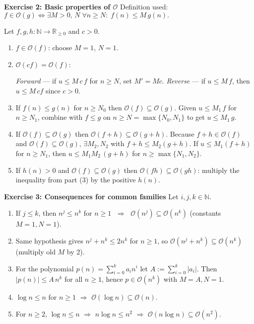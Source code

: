\documentclass{article}
\theoremstyle{theorem}
\theoremstyle{definition}
\theoremstyle{remark}
\begin{document}
\bigskip
\textbf{Exercise 2: Basic properties of \(\mathcal O\)}
Definition used: \(f\in\mathcal O(g)\iff\exists M>0,\,N\;\forall n\ge N:\;f(n)\le M\,g(n).\)

Let $f,g,h:\mathbb N\!\to\!\mathbb R_{\ge0}$ and $c>0$.

\begin{enumerate}
  \item $f\in\mathcal O(f)$: choose $M=1$, $N=1$.

  \item $\mathcal O(cf)=\mathcal O(f)$:  

        \emph{Forward} — if $u\le M\,c\,f$ for $n\ge N$, set $M'=Mc$.  
        \emph{Reverse} — if $u\le M\,f$, then $u\le M\,cf$ since $c>0$.

  \item If $f(n)\le g(n)$ for $n\ge N_0$ then $\mathcal O(f)\subseteq\mathcal O(g)$.  
        Given $u\le M_1\,f$ for $n\ge N_1$, combine with $f\le g$ on  
        $n\ge N=\max\{N_0,N_1\}$ to get $u\le M_1\,g$.

  \item If $\mathcal O(f)\subseteq\mathcal O(g)$ then  
        $\mathcal O(f+h)\subseteq\mathcal O(g+h)$.  
        Because $f+h\in\mathcal O(f)$ and $\mathcal O(f)\subseteq\mathcal O(g)$,  
        $\exists M_2,N_2$ with $f+h\le M_2(g+h)$.  
        If $u\le M_1(f+h)$ for $n\ge N_1$, then  
        $u\le M_1M_2\,(g+h)$ for $n\ge\max\{N_1,N_2\}$.

  \item If $h(n)>0$ and $\mathcal O(f)\subseteq\mathcal O(g)$ then  
        $\mathcal O(fh)\subseteq\mathcal O(gh)$:  
        multiply the inequality from part (3) by the positive $h(n)$.
\end{enumerate}


\bigskip
\textbf{Exercise 3: Consequences for common families}
Let $i,j,k\in\mathbb N$.

\begin{enumerate}
  \item If $j\le k$, then $n^{j}\le n^{k}$ for $n\ge1$  
        $\;\Rightarrow\;$ $\mathcal O(n^{j})\subseteq\mathcal O(n^{k})$  
        (constants $M=1,N=1$).

  \item Same hypothesis gives $n^{j}+n^{k}\le 2n^{k}$ for $n\ge1$,  
        so $\mathcal O(n^{j}+n^{k})\subseteq\mathcal O(n^{k})$  
        (multiply old $M$ by 2).

  \item For the polynomial $p(n)=\sum_{i=0}^{k}a_i n^{i}$ let  
        $A:=\sum_{i=0}^{k}|a_i|$.  Then  
        $\bigl|p(n)\bigr|\le A\,n^{k}$ for all $n\ge1$,  
        hence $p\in\mathcal O(n^{k})$ with $M=A,N=1$.

  \item $\log n \le n$ for $n\ge1$ $\Rightarrow$ $\mathcal O(\log n)\subseteq\mathcal O(n)$.

  \item For $n\ge2$, $\log n\le n$ $\Rightarrow$ $n\log n\le n^{2}$  
        $\Rightarrow$ $\mathcal O(n\log n)\subseteq\mathcal O(n^{2})$.
\end{enumerate}
\end{document}
